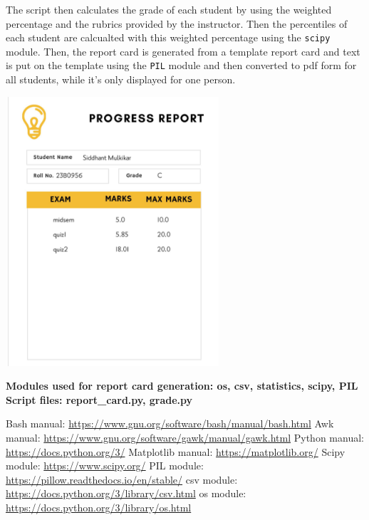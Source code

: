 \documentclass{article}
\begin{document}
The script then calculates the grade of each student by using the weighted percentage and the rubrics provided by the instructor. Then the percentiles of each student are calcualted with this weighted percentage using the \verb"scipy" module.
Then, the report card is generated from a template report card and text is put on the template using the \verb"PIL" module and then converted to pdf form for all students, while it's only displayed for one person.

\begin{center}
    \includegraphics[height=10cm,width=8cm]{report-card.png}
\end{center}

\textbf{Modules used for report card generation: os, csv, statistics, scipy, PIL}\\

\textbf{Script files: report\_card.py, grade.py}

\begin{thebibliography}{9}

Bash manual: \url{https://www.gnu.org/software/bash/manual/bash.html}
 Awk manual: \url{https://www.gnu.org/software/gawk/manual/gawk.html}
 Python manual: \url{https://docs.python.org/3/}
Matplotlib manual:  \url{https://matplotlib.org/}
Scipy module: \url{https://www.scipy.org/}
PIL module:  \url{https://pillow.readthedocs.io/en/stable/}
csv module: \url{https://docs.python.org/3/library/csv.html}
os module:  \url{https://docs.python.org/3/library/os.html}

\end{thebibliography}
\end{document}
